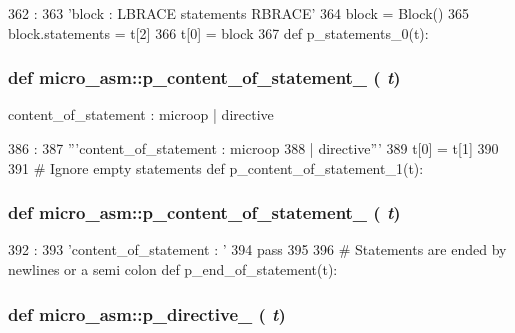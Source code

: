 \begin{DoxyCode}
362               :
363     'block : LBRACE statements RBRACE'
364     block = Block()
365     block.statements = t[2]
366     t[0] = block
367 
def p_statements_0(t):
\end{DoxyCode}
\hypertarget{namespacemicro__asm_a3e7c407b8a54e83439195cad9357af30}{
\subsubsection[{p\_\-content\_\-of\_\-statement\_\-0}]{\setlength{\rightskip}{0pt plus 5cm}def micro\_\-asm::p\_\-content\_\-of\_\-statement\_ ( {\em t})}}
\label{namespacemicro__asm_a3e7c407b8a54e83439195cad9357af30}
\begin{DoxyVerb}content_of_statement : microop
                        | directive\end{DoxyVerb}
 


\begin{DoxyCode}
386                                :
387     '''content_of_statement : microop
388                             | directive'''
389     t[0] = t[1]
390 
391 # Ignore empty statements
def p_content_of_statement_1(t):
\end{DoxyCode}
\hypertarget{namespacemicro__asm_a84b621725f0a85e7f52bfaeb974fedb7}{
\subsubsection[{p\_\-content\_\-of\_\-statement\_\-1}]{\setlength{\rightskip}{0pt plus 5cm}def micro\_\-asm::p\_\-content\_\-of\_\-statement\_ ( {\em t})}}
\label{namespacemicro__asm_a84b621725f0a85e7f52bfaeb974fedb7}



\begin{DoxyCode}
392                                :
393     'content_of_statement : '
394     pass
395 
396 # Statements are ended by newlines or a semi colon
def p_end_of_statement(t):
\end{DoxyCode}
\hypertarget{namespacemicro__asm_a8521fe516e58d23df8a9a00ffa804d91}{
\subsubsection[{p\_\-directive\_\-0}]{\setlength{\rightskip}{0pt plus 5cm}def micro\_\-asm::p\_\-directive\_ ( {\em t})}}
\label{namespacemicro__asm_a8521fe516e58d23df8a9a00ffa804d91}



